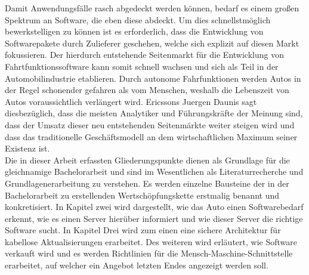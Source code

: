 Damit Anwendungsfälle rasch abgedeckt werden können, bedarf es einem großen Spektrum an Software, die eben diese abdeckt. Um dies schnellstmöglich bewerkstelligen zu können ist es erforderlich, dass die Entwicklung von Softwarepakete durch Zulieferer geschehen, welche sich explizit auf diesen Markt fokussieren. Der hierdurch entstehende Seitenmarkt für die Entwicklung von Fahrtfunktionssoftware kann somit schnell wachsen und sich als Teil in der Automobilindustrie etablieren. Durch autonome Fahrfunktionen werden Autos in der Regel schonender gefahren als vom Menschen, weshalb die Lebenszeit von Autos voraussichtlich verlängert wird.\cite[(S. 16)]{vda} Ericssons Juergen Daunis sagt diesbezüglich, dass die meisten Analytiker und Führungskräfte der Meinung sind, dass der Umsatz dieser neu entstehenden Seitenmärkte weiter steigen wird und dass das traditionelle Geschäftsmodell an dem wirtschaftlichen Maximum seiner Existenz ist.\cite{bmd} \\

Die in dieser Arbeit erfassten Gliederungspunkte dienen als Grundlage für die gleichnamige Bachelorarbeit und sind im Wesentlichen als Literaturrecherche und Grundlagenerarbeitung zu verstehen. Es werden einzelne Bausteine der in der Bachelorarbeit zu erstellenden Wertschöpfungskette erstmalig benannt und konkretisiert. In Kapitel zwei wird dargestellt, wie das Auto einen Softwarebedarf erkennt, wie es einen Server hierüber informiert und wie dieser Server die richtige Software sucht. In Kapitel Drei wird zum einen eine sichere Architektur für kabellose Aktualisierungen erarbeitet. Des weiteren wird erläutert, wie Software verkauft wird und es werden Richtlinien für die Mensch-Maschine-Schnittstelle erarbeitet, auf welcher ein Angebot letzten Endes angezeigt werden soll.
